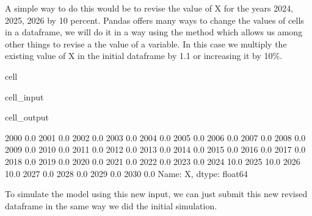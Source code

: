 \documentclass[letterpaper,10pt,english]{jupyterBook}
\begin{document}
\sphinxAtStartPar
A simple way to do this would be to revise the value of X for the years 2024, 2025, 2026 by 10 percent.  Pandas offers many ways to change the values of cells in a dataframe, we will do it in a  way using the method  which allows us among other things to revise a the value of a variable. In this case we  multiply the existing value of X in the initial dataframe by 1.1 or increasing it by 10\%.

\begin{sphinxuseclass}{cell}\begin{sphinxVerbatimInput}

\begin{sphinxuseclass}{cell_input}
\begin{sphinxVerbatim}[commandchars=\\\{\}]

\PYG{p}{[}\PYG{p}{]}\PYG{p}{[}\PYG{p}{]}
\end{sphinxVerbatim}

\end{sphinxuseclass}\end{sphinxVerbatimInput}
\begin{sphinxVerbatimOutput}

\begin{sphinxuseclass}{cell_output}
\begin{sphinxVerbatim}[commandchars=\\\{\}]
2000     0.0
2001     0.0
2002     0.0
2003     0.0
2004     0.0
2005     0.0
2006     0.0
2007     0.0
2008     0.0
2009     0.0
2010     0.0
2011     0.0
2012     0.0
2013     0.0
2014     0.0
2015     0.0
2016     0.0
2017     0.0
2018     0.0
2019     0.0
2020     0.0
2021     0.0
2022     0.0
2023     0.0
2024    10.0
2025    10.0
2026    10.0
2027     0.0
2028     0.0
2029     0.0
2030     0.0
Name: X, dtype: float64
\end{sphinxVerbatim}

\end{sphinxuseclass}\end{sphinxVerbatimOutput}

\end{sphinxuseclass}
\sphinxAtStartPar
To simulate the model using this new input, we can just submit this new revised dataframe in the same way we did the initial simulation.
\end{document}
